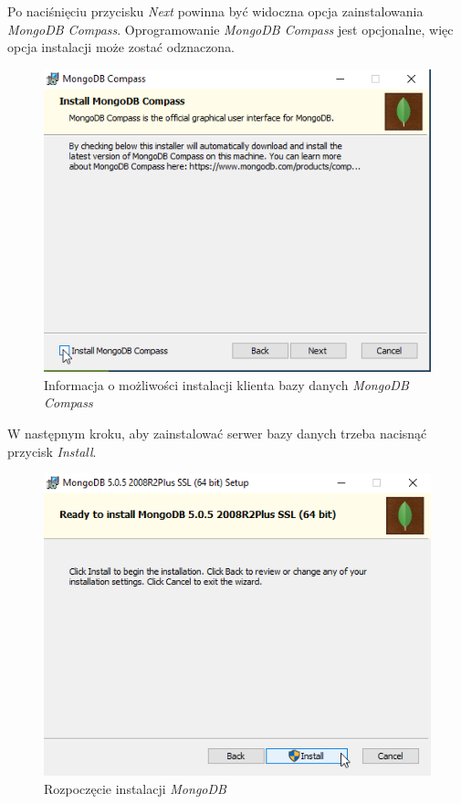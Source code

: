 \documentclass[a4paper,twoside,12pt]{book}
\begin{document}
{Po naciśnięciu przycisku \textit{Next} powinna być widoczna opcja zainstalowania \textit{MongoDB Compass}. Oprogramowanie \textit{MongoDB Compass} jest opcjonalne, więc opcja instalacji może zostać odznaczona.
\begin{figure}[h!]
	\centering
	\includegraphics[width=0.6\linewidth]{../zrzuty_ekranu/instalcja_mongodb/mogndodb5}
	\caption{Informacja o możliwości instalacji klienta bazy danych \textit{MongoDB Compass}}
	\label{fig:mogndodb5}
\end{figure}
\FloatBarrier

\newpage
W następnym kroku, aby zainstalować serwer bazy danych trzeba nacisnąć przycisk \textit{Install}.
\begin{figure}[h!]
	\centering
	\includegraphics[width=0.6\linewidth]{../zrzuty_ekranu/instalcja_mongodb/mongodb6}
	\caption{Rozpoczęcie instalacji \textit{MongoDB}}
	\label{fig:mongodb6}
\end{figure}
\FloatBarrier

}
\end{document}

